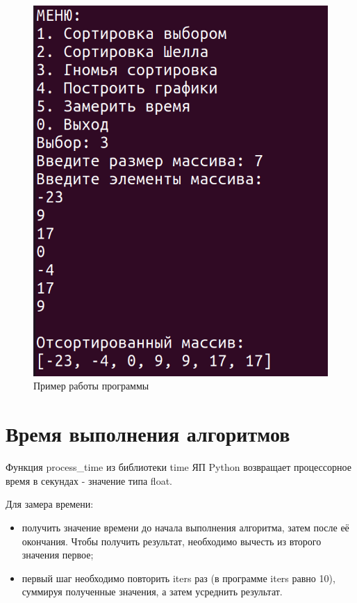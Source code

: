 \begin{figure}[H]
	\begin{center}
		\includegraphics[scale=0.3]{img/example.png}
	\end{center}
	\captionsetup{justification=centering}
	\caption{Пример работы программы}
	\label{img:example}
\end{figure}

\section{Время выполнения алгоритмов}

Функция process\_time из библиотеки time ЯП Python возвращает  процессорное время в секундах - значение типа float.

Для замера времени:
\begin{itemize}
	\item получить значение времени до начала выполнения алгоритма, затем после её окончания. Чтобы получить результат, необходимо вычесть из второго значения первое;
	\item первый шаг необходимо повторить iters раз (в программе iters равно 10), суммируя полученные значения, а затем усреднить результат.
\end{itemize}

